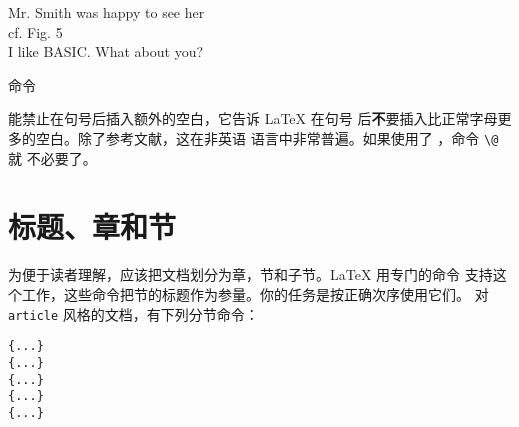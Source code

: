 \begin{example}
Mr. Smith was happy to see her\\
cf. Fig. 5\\
I like BASIC\@. What about you?
\end{example}

命令
\begin{lscommand}
\end{lscommand}
\noindent 能禁止在句号后插入额外的空白，它告诉 \LaTeX{} 在句号
后{\textbf 不}要插入比正常字母更多的空白。除了参考文献，这在非英语
语言中非常普遍。如果使用了 ，命令 \verb|\@| 就
不必要了。
\section{标题、章和节}

为便于读者理解，应该把文档划分为章，节和子节。\LaTeX{} 用专门的命令
支持这个工作，这些命令把节的标题作为参量。你的任务是按正确次序使用它们。
对 \texttt{article} 风格的文档，有下列分节命令：
 \nopagebreak
\begin{lscommand}
\verb|{...}|\\
\verb|{...}|\\
\verb|{...}|\\
\verb|{...}|\\
\verb|{...}|
\end{lscommand}

